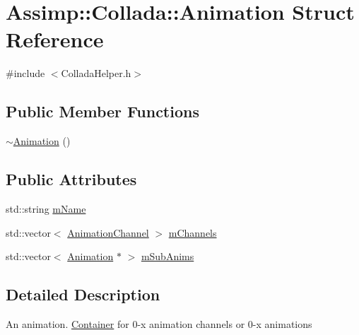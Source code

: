 \hypertarget{struct_assimp_1_1_collada_1_1_animation}{\section{Assimp\+:\+:Collada\+:\+:Animation Struct Reference}
\label{struct_assimp_1_1_collada_1_1_animation}
}


{\ttfamily \#include $<$Collada\+Helper.\+h$>$}

\subsection*{Public Member Functions}
\begin{DoxyCompactItemize}
\item 
\hyperlink{struct_assimp_1_1_collada_1_1_animation_abe30bd6eb296cef35240e0fd501e7281}{$\sim$\+Animation} ()
\end{DoxyCompactItemize}
\subsection*{Public Attributes}
\begin{DoxyCompactItemize}
\item 
std\+::string \hyperlink{struct_assimp_1_1_collada_1_1_animation_a1a8adf4fd345549579d6c86ad6e76ced}{m\+Name}
\item 
std\+::vector$<$ \hyperlink{struct_assimp_1_1_collada_1_1_animation_channel}{Animation\+Channel} $>$ \hyperlink{struct_assimp_1_1_collada_1_1_animation_a606cbd98c5f0b9c939792500797a8f12}{m\+Channels}
\item 
std\+::vector$<$ \hyperlink{struct_assimp_1_1_collada_1_1_animation}{Animation} $\ast$ $>$ \hyperlink{struct_assimp_1_1_collada_1_1_animation_a2606498598961cda77c034521fd8e11c}{m\+Sub\+Anims}
\end{DoxyCompactItemize}


\subsection{Detailed Description}
An animation. \hyperlink{class_container}{Container} for 0-\/x animation channels or 0-\/x animations 

